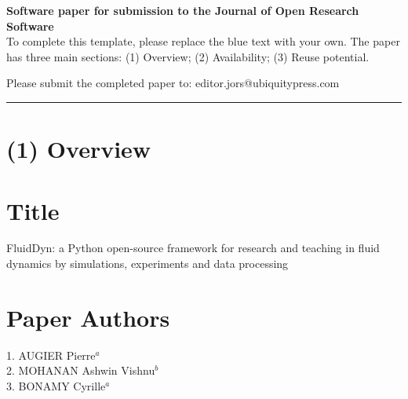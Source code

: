 \documentclass{../jors}
\begin{document}
{\bf Software paper for submission to the Journal of Open Research Software} \\

To complete this template, please replace the blue text with your own. The paper
has three main sections: (1) Overview; (2) Availability; (3) Reuse potential.

Please submit the completed paper to: editor.jors@ubiquitypress.com

\rule{\textwidth}{1pt}

\section*{(1) Overview}

\vspace{0.5cm}

\section*{Title}





FluidDyn: a Python open-source framework for research and teaching in fluid
dynamics by simulations, experiments and data processing

\section*{Paper Authors}


1. AUGIER Pierre$^a$\\
2. MOHANAN Ashwin Vishnu$^b$\\
3. BONAMY Cyrille$^a$\\
\end{document}
